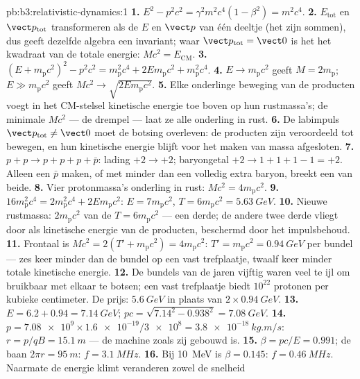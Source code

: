 \begin{solution}{pb:b3:relativistic-dynamics:1}
\textbf{1.} $E^2 - p^2c^2 = \gamma^2m^2c^4(1 - \beta^2) = m^2c^4$.
\textbf{2.} $E_{\text{tot}}$ en $\vect p_{\text{tot}}$ transformeren als
de $E$ en $\vect p$ van één deeltje (het zijn sommen), dus geeft dezelfde
algebra een invariant; waar $\vect p_{\text{tot}} = \vect 0$ is het het
kwadraat van de totale energie: $Mc^2 = E_{\text{CM}}$.
\textbf{3.} $(E + m_{\text{p}}c^2)^2 - p^2c^2 = m_{\text{p}}^2c^4 +
2Em_{\text{p}}c^2 + m_{\text{p}}^2c^4$.
\textbf{4.} $E \to m_{\text{p}}c^2$ geeft $M = 2m_{\text{p}}$;
$E \gg m_{\text{p}}c^2$ geeft $Mc^2 \to \sqrt{2Em_{\text{p}}c^2}$.
\textbf{5.} Elke onderlinge beweging van de producten voegt in het
CM-stelsel kinetische energie toe boven op hun rustmassa's; de minimale
$Mc^2$ --- de drempel --- laat ze alle onderling in rust.
\textbf{6.} De labimpuls $\vect p_{\text{tot}} \neq \vect 0$ moet de
botsing overleven: de producten zijn veroordeeld tot bewegen, en hun
kinetische energie blijft voor het maken van massa afgesloten.
\textbf{7.} $p + p \to p + p + p + \bar p$: lading $+2 \to +2$;
baryongetal $+2 \to 1 + 1 + 1 - 1 = +2$. Alleen een $\bar p$ maken, of
met minder dan een volledig extra baryon, breekt een van beide.
\textbf{8.} Vier protonmassa's onderling in rust: $Mc^2 =
4m_{\text{p}}c^2$.
\textbf{9.} $16m_{\text{p}}^2c^4 = 2m_{\text{p}}^2c^4 +
2Em_{\text{p}}c^2$: $E = 7m_{\text{p}}c^2$, $T = 6m_{\text{p}}c^2 =
\qty{5.63}{GeV}$.
\textbf{10.} Nieuwe rustmassa: $2m_{\text{p}}c^2$ van de $T =
6m_{\text{p}}c^2$ --- een derde; de andere twee derde vliegt door als
kinetische energie van de producten, beschermd door het impulsbehoud.
\textbf{11.} Frontaal is $Mc^2 = 2(T' + m_{\text{p}}c^2) =
4m_{\text{p}}c^2$: $T' = m_{\text{p}}c^2 = \qty{0.94}{GeV}$ per bundel
--- zes keer minder dan de bundel op een vast trefplaatje, twaalf keer
minder totale kinetische energie.
\textbf{12.} De bundels van de jaren vijftig waren veel te ijl om
bruikbaar met elkaar te botsen; een vast trefplaatje biedt $10^{22}$
protonen per kubieke centimeter. De prijs: $\qty{5.6}{GeV}$ in plaats
van $2 \times \qty{0.94}{GeV}$.
\textbf{13.} $E = 6.2 + 0.94 = \qty{7.14}{GeV}$; $pc =
\sqrt{7.14^2 - 0.938^2} = \qty{7.08}{GeV}$.
\textbf{14.} $p = \num{7.08e9} \times \num{1.6e-19}/\num{3e8} =
\qty{3.8e-18}{kg.m/s}$: $r = p/qB = \qty{15.1}{m}$ --- de machine zoals
zij gebouwd is.
\textbf{15.} $\beta = pc/E = 0.991$; de baan $2\pi r = \qty{95}{m}$:
$f = \qty{3.1}{MHz}$.
\textbf{16.} Bij \qty{10}{MeV} is $\beta = 0.145$: $f =
\qty{0.46}{MHz}$. Naarmate de energie klimt veranderen zowel de snelheid

\end{solution}
